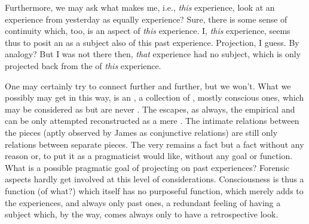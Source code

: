 
Furthermore, we may ask what makes me, i.e., {\em this}  experience,
look at an experience from yesterday as equally  experience?  Sure, there
is some sense of continuity which, too, is an aspect of {\em this} experience.
I, {\em this} experience, seems thus to posit an  as a subject also of
this past experience.  Projection, I guess.  By analogy?  But I was not there
then, {\em that} experience had no subject, which is only projected back from
the  of {\em this} experience.

\pa One may certainly try to connect further and further, but we won't.  What we
possibly may get in this way, is an , a collection of ,
mostly conscious ones, which may be considered as  but are never
.  The  escapes, as always, the empirical
 and can be only attempted reconstructed as a mere
.  The intimate relations between the pieces (aptly observed by
James as conjunctive relations) are still only relations between separate
pieces.  The very  remains a fact but
a fact without any reason or, to put it as a pragmaticist would like, without
any goal or function.  What is a possible pragmatic goal of projecting 
on past experiences?  Forensic aspects hardly get involved at this level of
considerations.  Consciousness is thus a function (of what?)  which itself has
no purposeful function, which merely adds to the  experiences, and
always only past ones, a redundant feeling of having a subject which, by the
way, comes always only  to have a retrospective look.


